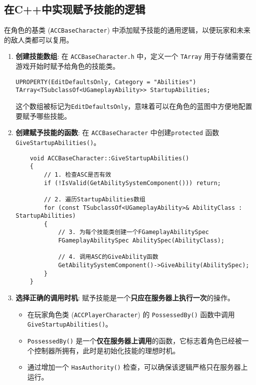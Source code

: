 \documentclass[math,code,10pt,CJKmath]{amznotes}
\newcommand{\il}[1]{\texttt{#1}}%
\begin{document}
\subsection{在C++中实现赋予技能的逻辑}
在角色的基类 (\texttt{ACCBaseCharacter}) 中添加赋予技能的通用逻辑，以便玩家和未来的敌人类都可以复用。
\begin{enumerate}
    \item \textbf{创建技能数组}: 在 \texttt{ACCBaseCharacter.h} 中，定义一个 \texttt{TArray} 用于存储需要在游戏开始时赋予给角色的技能类。
\begin{verbatim}
UPROPERTY(EditDefaultsOnly, Category = "Abilities")
TArray<TSubclassOf<UGameplayAbility>> StartupAbilities;
\end{verbatim}
    这个数组被标记为\texttt{EditDefaultsOnly}，意味着可以在角色的蓝图中方便地配置要赋予哪些技能。

    \item \textbf{创建赋予技能的函数}: 在 \texttt{ACCBaseCharacter} 中创建\il{protected} 函数 \texttt{GiveStartupAbilities()}。
    \begin{verbatim}
    void ACCBaseCharacter::GiveStartupAbilities()
    {
        // 1. 检查ASC是否有效
        if (!IsValid(GetAbilitySystemComponent())) return;

        // 2. 遍历StartupAbilities数组
        for (const TSubclassOf<UGameplayAbility>& AbilityClass : StartupAbilities)
        {
            // 3. 为每个技能类创建一个FGameplayAbilitySpec
            FGameplayAbilitySpec AbilitySpec(AbilityClass);

            // 4. 调用ASC的GiveAbility函数
            GetAbilitySystemComponent()->GiveAbility(AbilitySpec);
        }
    }
    \end{verbatim}

    \item \textbf{选择正确的调用时机}: 赋予技能是一个\textbf{只应在服务器上执行一次}的操作。
    \begin{itemize}
        \item 在玩家角色类 (\texttt{ACCPlayerCharacter}) 的 \texttt{PossessedBy()} 函数中调用 \texttt{GiveStartupAbilities()}。
        \item \texttt{PossessedBy()} 是一个\textbf{仅在服务器上调用}的函数，它标志着角色已经被一个控制器所拥有，此时是初始化技能的理想时机。
        \item 通过增加一个 \texttt{HasAuthority()} 检查，可以确保该逻辑严格只在服务器上运行。
    \end{itemize}
\end{enumerate}
\end{document}

